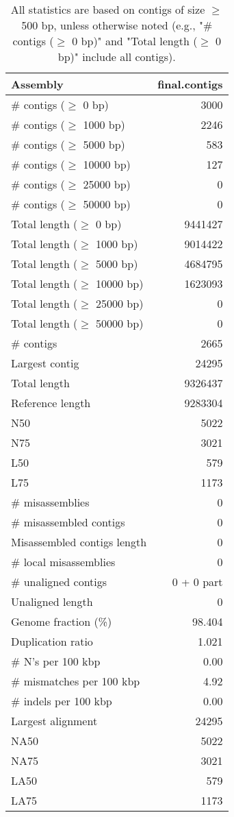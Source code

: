 \documentclass[12pt,a4paper]{article}
\begin{document}
\begin{table}[ht]
\begin{center}
\caption{All statistics are based on contigs of size $\geq$ 500 bp, unless otherwise noted (e.g., "\# contigs ($\geq$ 0 bp)" and "Total length ($\geq$ 0 bp)" include all contigs).}
\begin{tabular}{|l*{1}{|r}|}
\hline
Assembly & final.contigs \\ \hline
\# contigs ($\geq$ 0 bp) & 3000 \\ \hline
\# contigs ($\geq$ 1000 bp) & 2246 \\ \hline
\# contigs ($\geq$ 5000 bp) & 583 \\ \hline
\# contigs ($\geq$ 10000 bp) & 127 \\ \hline
\# contigs ($\geq$ 25000 bp) & 0 \\ \hline
\# contigs ($\geq$ 50000 bp) & 0 \\ \hline
Total length ($\geq$ 0 bp) & 9441427 \\ \hline
Total length ($\geq$ 1000 bp) & 9014422 \\ \hline
Total length ($\geq$ 5000 bp) & 4684795 \\ \hline
Total length ($\geq$ 10000 bp) & 1623093 \\ \hline
Total length ($\geq$ 25000 bp) & 0 \\ \hline
Total length ($\geq$ 50000 bp) & 0 \\ \hline
\# contigs & 2665 \\ \hline
Largest contig & 24295 \\ \hline
Total length & 9326437 \\ \hline
Reference length & 9283304 \\ \hline
N50 & 5022 \\ \hline
N75 & 3021 \\ \hline
L50 & 579 \\ \hline
L75 & 1173 \\ \hline
\# misassemblies & 0 \\ \hline
\# misassembled contigs & 0 \\ \hline
Misassembled contigs length & 0 \\ \hline
\# local misassemblies & 0 \\ \hline
\# unaligned contigs & 0 + 0 part \\ \hline
Unaligned length & 0 \\ \hline
Genome fraction (\%) & 98.404 \\ \hline
Duplication ratio & 1.021 \\ \hline
\# N's per 100 kbp & 0.00 \\ \hline
\# mismatches per 100 kbp & 4.92 \\ \hline
\# indels per 100 kbp & 0.00 \\ \hline
Largest alignment & 24295 \\ \hline
NA50 & 5022 \\ \hline
NA75 & 3021 \\ \hline
LA50 & 579 \\ \hline
LA75 & 1173 \\ \hline
\end{tabular}
\end{center}
\end{table}
\end{document}
